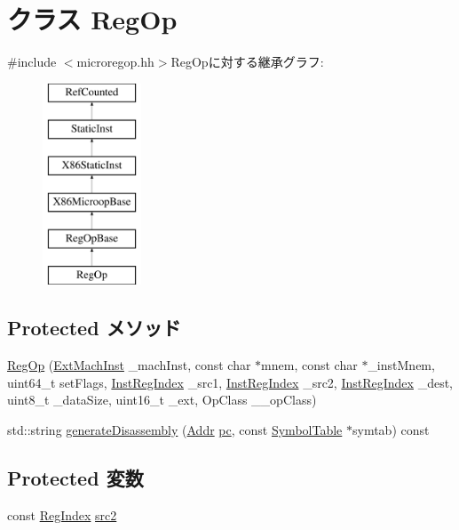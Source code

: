 \hypertarget{classX86ISA_1_1RegOp}{
\section{クラス RegOp}
\label{classX86ISA_1_1RegOp}
}


{\ttfamily \#include $<$microregop.hh$>$}RegOpに対する継承グラフ:\begin{figure}[H]
\begin{center}
\leavevmode
\includegraphics[height=6cm]{classX86ISA_1_1RegOp}
\end{center}
\end{figure}
\subsection*{Protected メソッド}
\begin{DoxyCompactItemize}
\item 
\hyperlink{classX86ISA_1_1RegOp_afe4eb90e103a014d0e48f33fe05d56b6}{RegOp} (\hyperlink{structX86ISA_1_1ExtMachInst}{ExtMachInst} \_\-machInst, const char $\ast$mnem, const char $\ast$\_\-instMnem, uint64\_\-t setFlags, \hyperlink{structX86ISA_1_1InstRegIndex}{InstRegIndex} \_\-src1, \hyperlink{structX86ISA_1_1InstRegIndex}{InstRegIndex} \_\-src2, \hyperlink{structX86ISA_1_1InstRegIndex}{InstRegIndex} \_\-dest, uint8\_\-t \_\-dataSize, uint16\_\-t \_\-ext, OpClass \_\-\_\-opClass)
\item 
std::string \hyperlink{classX86ISA_1_1RegOp_a95d323a22a5f07e14d6b4c9385a91896}{generateDisassembly} (\hyperlink{base_2types_8hh_af1bb03d6a4ee096394a6749f0a169232}{Addr} \hyperlink{namespaceX86ISA_aecb63c74e066ecd98e04d057e39028c9}{pc}, const \hyperlink{classSymbolTable}{SymbolTable} $\ast$symtab) const 
\end{DoxyCompactItemize}
\subsection*{Protected 変数}
\begin{DoxyCompactItemize}
\item 
const \hyperlink{classStaticInst_a36d25e03e43fa3bb4c5482cbefe5e0fb}{RegIndex} \hyperlink{classX86ISA_1_1RegOp_ae5f4f8a3a7b6e717a2cff2990c4ecfff}{src2}
\end{DoxyCompactItemize}


